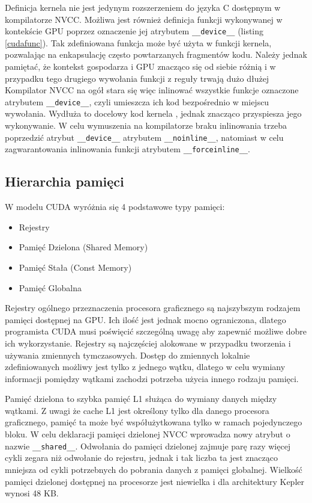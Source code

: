 Definicja kernela nie jest jedynym rozszerzeniem do języka C dostępnym w
kompilatorze NVCC. Możliwa jest również definicja funkcji wykonywanej w
kontekście GPU poprzez oznaczenie jej atrybutem \texttt{\_\_device\_\_} (listing
		\ref{cudafunc}). Tak zdefiniowana funkcja może być użyta w funkcji
kernela, pozwalając na enkapsulację często powtarzanych fragmentów kodu. Należy
jednak pamiętać, że kontekst gospodarza i GPU znacząco się od siebie różnią i w
przypadku tego drugiego wywołania funkcji z reguły trwają dużo
dłużej\cite{Nvi11b} Kompilator NVCC na ogół stara się więc inlinować wszystkie
funkcje oznaczone atrybutem \texttt{\_\_device\_\_}, czyli umieszcza ich kod
bezpośrednio w miejscu wywołania. Wydłuża to docelowy kod kernela , jednak
znacząco przyspiesza jego wykonywanie. W celu wymuszenia na kompilatorze braku
inlinowania trzeba poprzedzić atrybut \texttt{\_\_device\_\_} atrybutem
\texttt{\_\_noinline\_\_}, natomiast w celu zagwarantowania inlinowania funkcji
atrybutem \texttt{\_\_forceinline\_\_}.

\subsection{Hierarchia pamięci}
\label{ssec:mem}

W modelu CUDA wyróżnia się 4 podstawowe typy pamięci:
\begin{itemize}
\item Rejestry
\item Pamięć Dzielona (Shared Memory)
\item Pamięć Stała (Const Memory)
\item Pamięć Globalna
\end{itemize}

Rejestry ogólnego przeznaczenia procesora graficznego są najszybszym rodzajem
pamięci dostępnej na GPU.  Ich ilość jest jednak mocno ograniczona, dlatego
programista CUDA musi poświęcić szczególną uwagę aby zapewnić możliwe dobre ich
wykorzystanie. Rejestry są najczęściej alokowane w przypadku tworzenia i
używania zmiennych tymczasowych. Dostęp do zmiennych lokalnie zdefiniowanych
możliwy jest tylko z jednego wątku, dlatego w celu wymiany informacji pomiędzy
wątkami zachodzi potrzeba użycia innego rodzaju pamięci.

Pamięć dzielona to szybka pamięć L1 służąca do wymiany danych między wątkami.
Z uwagi że cache L1 jest określony tylko dla danego procesora graficznego,
  pamięć ta może być współużytkowana tylko w ramach pojedynczego bloku. W celu
  deklaracji pamięci dzielonej NVCC wprowadza nowy atrybut o nazwie
  \texttt{\_\_shared\_\_}. Odwołania do pamięci dzielonej zajmuje parę razy
  więcej cykli zegara niż odwołanie do rejestru, jednak i tak liczba ta jest
  znacząco mniejsza od cykli potrzebnych do pobrania danych z pamięci globalnej.
  Wielkość pamięci dzielonej dostępnej na procesorze jest niewielka i dla
  architektury Kepler wynosi 48 KB.

